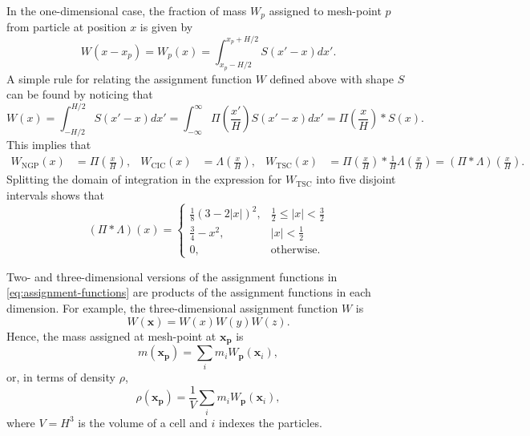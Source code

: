 In the one-dimensional case, the fraction of mass $W_p$ assigned to mesh-point $p$ from particle at position $x$ is given by
\begin{equation*}
    W(x-x_p) = W_p(x) = \int_{x_p-H/2}^{x_p+H/2} S(x'-x)dx'.
\end{equation*}
A simple rule for relating the assignment function $W$ defined above with shape $S$ can be found by noticing that
\begin{equation*}
    W(x) = \int_{-H/2}^{H/2}S(x'-x)dx' = \int_{-\infty}^\infty \Pi\left(\frac{x'}{H}\right)S(x'-x)dx' = \Pi\left(\frac{x}{H}\right) * S(x).
\end{equation*}
This implies that
\begin{align}\label{eq:assignment-functions}
    W_\text{NGP}(x) & = \Pi\left(\frac{x}{H}\right), & W_\text{CIC}(x) & = \Lambda\left(\frac{x}{H}\right), & W_\text{TSC}(x) & = \Pi\left(\frac{x}{H}\right) * \frac{1}{H} \Lambda\left(\frac{x}{H}\right) = (\Pi * \Lambda)\left(\frac{x}{H}\right).
\end{align}
Splitting the domain of integration in the expression for $W_\text{TSC}$ into five disjoint intervals shows that
\begin{equation*}
    (\Pi * \Lambda)(x) = \begin{cases}
        \frac{1}{8}(3-2|x|)^2, & \frac{1}{2} \leq |x| < \frac{3}{2} \\
        \frac{3}{4}-x^2,       & |x| < \frac{1}{2}                  \\
        0,                     & \text{otherwise}.
    \end{cases}
\end{equation*}

Two- and three-dimensional versions of the assignment functions in \autoref{eq:assignment-functions} are products of the assignment functions in each dimension.
For example, the three-dimensional assignment function $W$ is
\begin{equation*}
    W(\mathbf{x}) = W(x)W(y)W(z).
\end{equation*}
Hence, the mass assigned at mesh-point at $\mathbf{x}_\mathbf{p}$ is
\begin{equation*}
    m(\mathbf{x}_\mathbf{p}) = \sum_i m_i W_\mathbf{p}(\mathbf{x}_i),
\end{equation*}
or, in terms of density $\rho$,
\begin{equation}\label{eq:density-assignment}
    \rho(\mathbf{x}_\mathbf{p}) = \frac{1}{V} \sum_i m_i W_\mathbf{p}(\mathbf{x}_i),
\end{equation}
where $V = H^3$ is the volume of a cell and $i$ indexes the particles.

